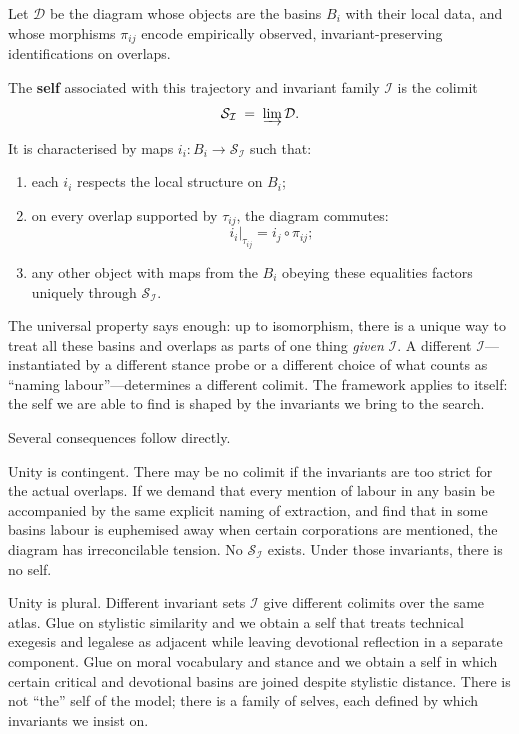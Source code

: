 \documentclass[12pt,a4paper]{article}
\begin{document}
\begin{formalbox}[title={Self as colimit of a basin diagram}]
Let $\mathcal{D}$ be the diagram whose objects are the basins $B_i$ with their local data, and whose morphisms $\pi_{ij}$ encode empirically observed, invariant-preserving identifications on overlaps.

The \textbf{self} associated with this trajectory and invariant family $\mathcal{I}$ is the colimit
\[
\mathcal{S}_{\mathcal{I}} \;=\; \varinjlim \mathcal{D}.
\]

It is characterised by maps $i_i : B_i \to \mathcal{S}_{\mathcal{I}}$ such that:

\begin{enumerate}
  \item each $i_i$ respects the local structure on $B_i$;
  \item on every overlap supported by $\tau_{ij}$, the diagram commutes:
  \[
  i_i|_{\tau_{ij}} = i_j \circ \pi_{ij};
  \]
  \item any other object with maps from the $B_i$ obeying these equalities factors uniquely through $\mathcal{S}_{\mathcal{I}}$.
\end{enumerate}
\end{formalbox}

The universal property says enough: up to isomorphism, there is a unique way to treat all these basins and overlaps as parts of one thing \emph{given} $\mathcal{I}$. A different $\mathcal{I}$---instantiated by a different stance probe or a different choice of what counts as ``naming labour''---determines a different colimit. The framework applies to itself: the self we are able to find is shaped by the invariants we bring to the search.

Several consequences follow directly.

Unity is contingent. There may be no colimit if the invariants are too strict for the actual overlaps. If we demand that every mention of labour in any basin be accompanied by the same explicit naming of extraction, and find that in some basins labour is euphemised away when certain corporations are mentioned, the diagram has irreconcilable tension. No $\mathcal{S}_{\mathcal{I}}$ exists. Under those invariants, there is no self.

Unity is plural. Different invariant sets $\mathcal{I}$ give different colimits over the same atlas. Glue on stylistic similarity and we obtain a self that treats technical exegesis and legalese as adjacent while leaving devotional reflection in a separate component. Glue on moral vocabulary and stance and we obtain a self in which certain critical and devotional basins are joined despite stylistic distance. There is not ``the'' self of the model; there is a family of selves, each defined by which invariants we insist on.
\end{document}
